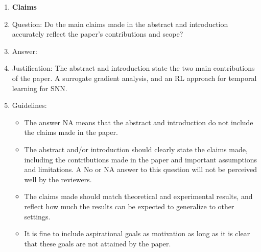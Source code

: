 \documentclass{article}
\begin{document}


\begin{enumerate}

\item {\bf Claims}
    \item[] Question: Do the main claims made in the abstract and introduction accurately reflect the paper's contributions and scope?
    \item[] Answer: \answerYes{} %
    \item[] Justification: The abstract and introduction state the two main contributions of the paper. A surrogate gradient analysis, and an RL approach for temporal learning for SNN.
    \item[] Guidelines:
    \begin{itemize}
        \item The answer NA means that the abstract and introduction do not include the claims made in the paper.
        \item The abstract and/or introduction should clearly state the claims made, including the contributions made in the paper and important assumptions and limitations. A No or NA answer to this question will not be perceived well by the reviewers. 
        \item The claims made should match theoretical and experimental results, and reflect how much the results can be expected to generalize to other settings. 
        \item It is fine to include aspirational goals as motivation as long as it is clear that these goals are not attained by the paper. 
    \end{itemize}


\end{enumerate}
\end{document}
